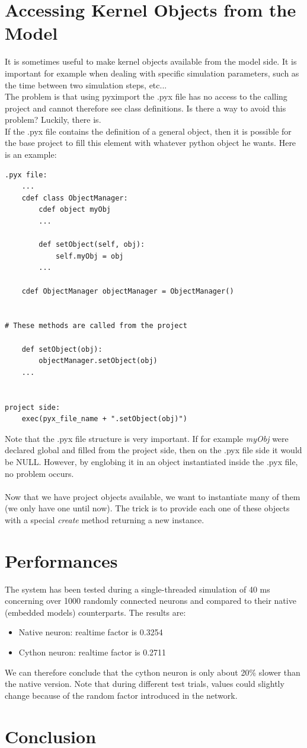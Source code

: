 \documentclass{article}
\begin{document}
\section{Accessing Kernel Objects from the Model}
It is sometimes useful to make kernel objects available from the model side. It is important for example when dealing with specific simulation parameters, such as the time between two simulation steps, etc...\\
The problem is that using pyximport the .pyx file has no access to the calling project and cannot therefore see class definitions. Is there a way to avoid this problem? Luckily, there is.\\
If the .pyx file contains the definition of a general object, then it is possible for the base project to fill this element with whatever python object he wants. Here is an example:
\begin{verbatim}
.pyx file:
    ...
    cdef class ObjectManager:
        cdef object myObj
        ...

        def setObject(self, obj):
            self.myObj = obj
        ...

    cdef ObjectManager objectManager = ObjectManager()


# These methods are called from the project 

    def setObject(obj):
        objectManager.setObject(obj)
    ...


project side:
    exec(pyx_file_name + ".setObject(obj)")
\end{verbatim}
Note that the .pyx file structure is very important. If for example \emph{myObj} were declared global and filled from the project side, then on the .pyx file side it would be NULL. However, by englobing it in an object instantiated inside the .pyx file, no problem occurs.\\ \\

Now that we have project objects available, we want to instantiate many of them (we only have one until now). The trick is to provide each one of these objects with a special \emph{create} method returning a new instance.


\section{Performances}
The system has been tested during a single-threaded simulation of 40 ms concerning over 1000 randomly connected neurons and compared to their native (embedded models) counterparts. The results are:
\begin{itemize}
\item Native neuron: realtime factor is 0.3254
\item Cython neuron: realtime factor is 0.2711
\end{itemize}
We can therefore conclude that the cython neuron is only about 20\% slower than the native version.
Note that during different test trials, values could slightly change because of the random factor introduced in the network.


\section{Conclusion}
\end{document}
